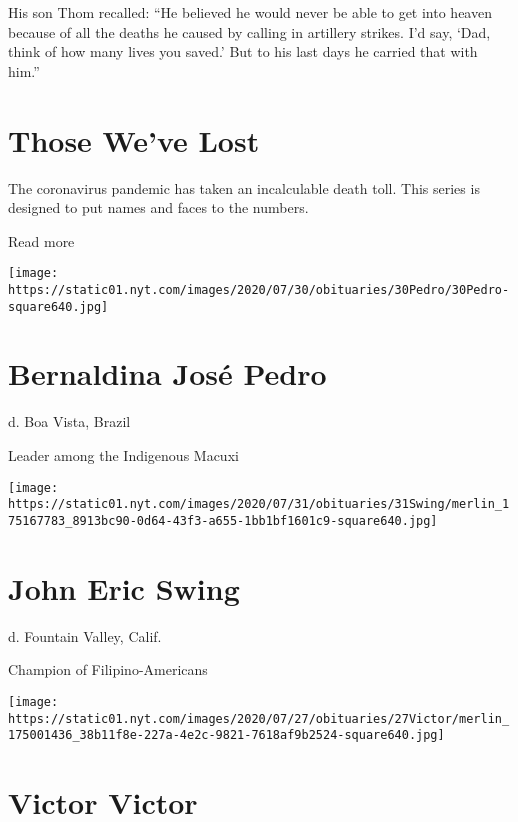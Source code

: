 His son Thom recalled: ``He believed he would never be able to get into
heaven because of all the deaths he caused by calling in artillery
strikes. I'd say, `Dad, think of how many lives you saved.' But to his
last days he carried that with him.''

\href{https://www.nytimes.com/interactive/2020/obituaries/people-died-coronavirus-obituaries.html?action=click\&pgtype=Article\&state=default\&region=BELOW_MAIN_CONTENT\&context=covid_obits_promo}{}

\hypertarget{those-weve-lost}{%
\section{Those We've Lost}\label{those-weve-lost}}

The coronavirus pandemic has taken an incalculable death toll. This
series is designed to put names and faces to the numbers.

Read more

\texttt{[image: https://static01.nyt.com/images/2020/07/30/obituaries/30Pedro/30Pedro-square640.jpg]}

\hypertarget{bernaldina-josuxe9-pedro}{%
\section{Bernaldina José Pedro}\label{bernaldina-josuxe9-pedro}}

d. Boa Vista, Brazil

Leader among the Indigenous Macuxi

\texttt{[image: https://static01.nyt.com/images/2020/07/31/obituaries/31Swing/merlin\_175167783\_8913bc90-0d64-43f3-a655-1bb1bf1601c9-square640.jpg]}

\hypertarget{john-eric-swing}{%
\section{John Eric Swing}\label{john-eric-swing}}

d. Fountain Valley, Calif.

Champion of Filipino-Americans

\texttt{[image: https://static01.nyt.com/images/2020/07/27/obituaries/27Victor/merlin\_175001436\_38b11f8e-227a-4e2c-9821-7618af9b2524-square640.jpg]}

\hypertarget{victor-victor}{%
\section{Victor Victor}\label{victor-victor}}

